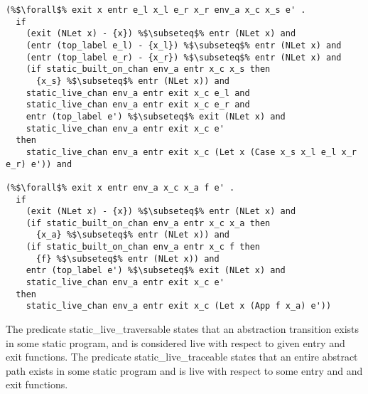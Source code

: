 \documentclass{article}
\begin{document}
\begin{lstlisting}[language=logic, style=codestyle1, escapechar=\%]
(%$\forall$% exit x entr e_l x_l e_r x_r env_a x_c x_s e' .
  if 
    (exit (NLet x) - {x}) %$\subseteq$% entr (NLet x) and
    (entr (top_label e_l) - {x_l}) %$\subseteq$% entr (NLet x) and
    (entr (top_label e_r) - {x_r}) %$\subseteq$% entr (NLet x) and
    (if static_built_on_chan env_a entr x_c x_s then
      {x_s} %$\subseteq$% entr (NLet x)) and
    static_live_chan env_a entr exit x_c e_l and
    static_live_chan env_a entr exit x_c e_r and
    entr (top_label e') %$\subseteq$% exit (NLet x) and
    static_live_chan env_a entr exit x_c e'
  then 
    static_live_chan env_a entr exit x_c (Let x (Case x_s x_l e_l x_r e_r) e')) and

(%$\forall$% exit x entr env_a x_c x_a f e' .
  if
    (exit (NLet x) - {x}) %$\subseteq$% entr (NLet x) and
    (if static_built_on_chan env_a entr x_c x_a then
      {x_a} %$\subseteq$% entr (NLet x)) and
    (if static_built_on_chan env_a entr x_c f then
      {f} %$\subseteq$% entr (NLet x)) and
    entr (top_label e') %$\subseteq$% exit (NLet x) and
    static_live_chan env_a entr exit x_c e'
  then
    static_live_chan env_a entr exit x_c (Let x (App f x_a) e'))

  \end{lstlisting}

The predicate static\_live\_traversable states that an abstraction transition exists in some
static program, and is considered live with respect to given entry and exit functions.  The predicate
static\_live\_traceable states that an entire abstract path exists in some static program and is live with
respect to some entry and and exit functions.   
\end{document}
